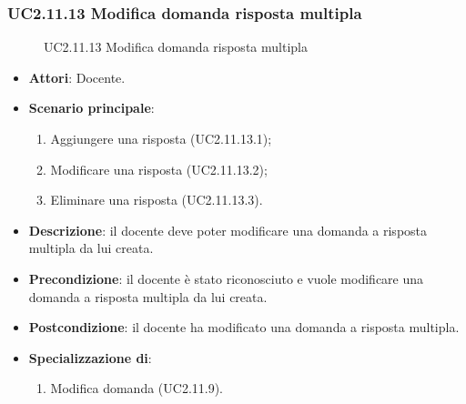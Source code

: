 \subsubsection{UC2.11.13 Modifica domanda risposta multipla}
\begin{figure}[H]
\centering
\noindent{}
\caption{UC2.11.13 Modifica domanda risposta multipla}
\end{figure}
\begin{itemize}
\item \textbf{Attori}: Docente.
\item \textbf{Scenario principale}:
\begin{enumerate}
\item Aggiungere una risposta (UC2.11.13.1);
\item Modificare una risposta (UC2.11.13.2);
\item Eliminare una risposta (UC2.11.13.3).
\end{enumerate}
\item \textbf{Descrizione}: il docente deve poter modificare una domanda a risposta multipla da lui creata.
\item \textbf{Precondizione}: il docente è stato riconosciuto e vuole modificare una domanda a risposta multipla da lui creata.
\item \textbf{Postcondizione}: il docente ha modificato una domanda a risposta multipla.
\item \textbf{Specializzazione di}:
\begin{enumerate}
\item Modifica domanda (UC2.11.9).
\end{enumerate}
\end{itemize}
